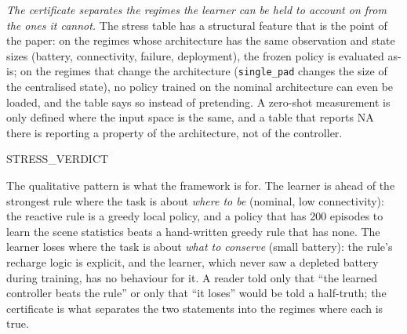
\emph{The certificate separates the regimes the learner can be held to
account on from the ones it cannot.}  The stress table has a structural
feature that is the point of the paper: on the regimes whose architecture
has the same observation and state sizes (battery, connectivity, failure,
deployment), the frozen policy is evaluated as-is; on the regimes that
change the architecture (\texttt{single\_pad} changes the size of the
centralised state), no policy trained on the nominal architecture can even
be loaded, and the table says so instead of pretending.  A zero-shot
measurement is only defined where the input space is the same, and a table
that reports NA there is reporting a property of the architecture, not of
the controller.

{{STRESS_VERDICT}}

The qualitative pattern is what the framework is for.  The learner is ahead
of the strongest rule where the task is about \emph{where to be} (nominal,
low connectivity): the reactive rule is a greedy local policy, and a policy
that has 200 episodes to learn the scene statistics beats a hand-written
greedy rule that has none.  The learner loses where the task is about
\emph{what to conserve} (small battery): the rule's recharge logic is
explicit, and the learner, which never saw a depleted battery during
training, has no behaviour for it.  A reader told only that ``the learned
controller beats the rule'' or only that ``it loses'' would be told a
half-truth; the certificate is what separates the two statements into the
regimes where each is true.
